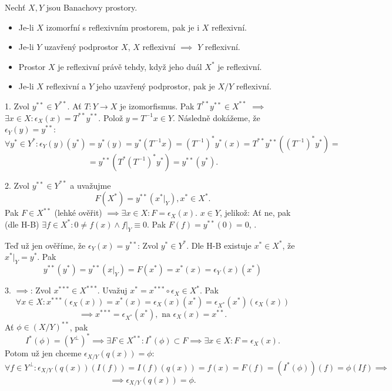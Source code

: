 \documentclass[12pt]{article}					%
\begin{document}
\begin{veta}
	Nechť $X, Y$ jsou Banachovy prostory.

	\begin{itemize}
		\item Je-li $X$ izomorfní s reflexivním prostorem, pak je i $X$ reflexivní.
		\item Je-li $Y$ uzavřený podprostor $X$, $X$ reflexivní $\implies$ $Y$ reflexivní.
		\item Prostor $X$ je reflexivní právě tehdy, když jeho duál $X^*$ je reflexivní.
		\item Je-li $X$ reflexivní a $Y$ jeho uzavřený podprostor, pak je $X / Y$ reflexivní.
	\end{itemize}

	\begin{dukazin}
		1. Zvol $y^{**} \in Y^{**}$. Ať $T: Y \rightarrow X$ je izomorfismus. Pak $T^{**}y^{**} \in X^{**}$ $\implies$ $\exists x \in X: \epsilon_X(x) = T^{**}y^{**}$. Polož $y = T^{-1}x \in Y$. Následně dokážeme, že $\epsilon_Y(y) = y^{**}$:
		$$ \forall y^* \in Y^*: \epsilon_Y(y)(y^*) = y^*(y) = y^*(T^{-1}x) = (T^{-1})^* y^*(x) = T^{**}y^{**} ((T^{-1})^*y^*) = $$
		$$ = y^{**}(T^*(T^{-1})^* y^*) = y^{**}(y^*). $$

		2. Zvol $y^{**} \in Y^{**}$ a uvažujme
		$$ F(X^*) = y^{**}(x^*|_Y), x^* \in X^*. $$
		Pak $F \in X^{**}$ (lehké ověřit) $\implies \exists x \in X: F = \epsilon_X(x)$. $x \in Y$, jelikož: Ať ne, pak (dle H-B) $\exists f \in X^*: 0 ≠ f(x)\land f|_Y ≡ 0$. Pak $F(f) = y^{**}(0) = 0$, \lightning.

		Teď už jen ověříme, že $\epsilon_Y(x) = y^{**}$: Zvol $y^* \in Y^*$. Dle H-B existuje $x^* \in X^*$, že $x^*|_Y = y^*$. Pak
		$$ y^{**}(y^*) = y^{**}(x|_Y) = F(x^*) = x^*(x) = \epsilon_Y (x) (x^*) $$

		3. $\implies$: Zvol $x^{***} \in X^{***}$. Uvažuj $x^* = x^{***}\circ \epsilon_X \in X^*$. Pak
		$$ \forall x \in X: x^{***}(\epsilon_X(x)) = x^*(x) = \epsilon_X(x)(x^*) = \epsilon_{X^*}(x^*)(\epsilon_X(x)) $$
		$$ \implies x^{***} = \epsilon_{X^*}(x^*), \text{ na } \epsilon_X(x) = x^{**}. $$
		Ať $\phi \in (X / Y)^{**}$, pak
		$$ I^*(\phi) = (Y^\perp)^* \implies \exists F \in X^{**}: I^*(\phi) \subset F \implies \exists x \in X: F = \epsilon_X(x). $$
		Potom už jen chceme $\epsilon_{X / Y}(q(x)) = \phi$:
		$$ \forall f \in Y^\perp: \epsilon_{X / Y}(q(x))(I(f)) = I(f)(q(x)) = f(x) = F(f) = (I^*(\phi))(f) = \phi(I f) \implies $$
		$$ \implies \epsilon_{X / Y}(q(x)) = \phi. $$
	\end{dukazin}
\end{veta}
\end{document}
